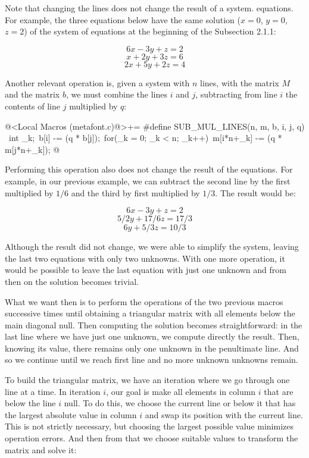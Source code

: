 Note that changing the lines does not change the result of a system.
equations. For example, the three equations below have the same
solution ($x=0$, $y=0$, $z=2$) of the system of equations at the
beginning of the Subsection 2.1.1:

$$
6x-3y+z=2
$$
$$
x+2y+3z = 6
$$
$$
2x+5y+2z=4
$$

Another relevant operation is, given a system with $n$ lines, with the
matrix $M$ and the matrix $b$, we must combine the lines $i$ and $j$,
subtracting from line $i$ the contents of line $j$ multiplied by $q$:

\iniciocodigo
@<Local Macros (metafont.c)@>+=
#define SUB_MUL_LINES(n, m, b, i, j, q) {\
  int _k;\
  b[i] -= (q * b[j]);\
  for(_k = 0; _k < n; _k++){\
      m[i*n+_k] -= (q * m[j*n+_k]);}}
@
\fimcodigo

Performing this operation also does not change the result of the
equations. For example, in our previous example, we can subtract the
second line by the first multiplied by $1/6$ and the third by first
multiplied by $1/3$. The result would be:

$$
6x-3y+z=2
$$
$$
5/2y+17/6z = 17/3
$$
$$
6y+5/3z=10/3
$$

Although the result did not change, we were able to simplify the
system, leaving the last two equations with only two unknowns. With
one more operation, it would be possible to leave the last equation
with just one unknown and from then on the solution becomes trivial.

What we want then is to perform the operations of the two previous
macros successive times until obtaining a triangular matrix with all
elements below the main diagonal null. Then computing the solution
becomes straightforward: in the last line where we have just one
unknown, we compute directly the result. Then, knowing its value,
there remains only one unknown in the penultimate line. And so we
continue until we reach first line and no more unknown unknowns
remain.

To build the triangular matrix, we have an iteration where we go
through one line at a time. In iteration $i$, our goal is make all
elements in column $i$ that are below the line $i$ null. To do this,
we choose the current line or below it that has the largest absolute
value in column $i$ and swap its position with the current line. This
is not strictly necessary, but choosing the largest possible value
minimizes operation errors. And then from that we choose suitable
values ​​to transform the matrix and solve it:


